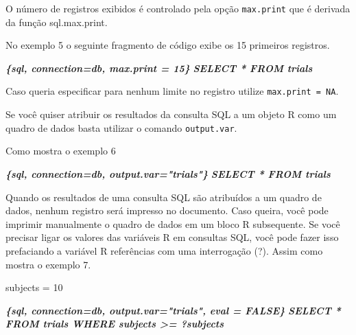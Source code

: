 \documentclass[
]{book}
\newenvironment{Shaded}{\begin{snugshade}}{\end{snugshade}}
\newcommand{\DecValTok}[1]{\textcolor[rgb]{0.00,0.00,0.81}{#1}}
\newcommand{\InformationTok}[1]{\textcolor[rgb]{0.56,0.35,0.01}{\textbf{\textit{#1}}}}
\newcommand{\NormalTok}[1]{#1}
\newcommand{\StringTok}[1]{\textcolor[rgb]{0.31,0.60,0.02}{#1}}
\begin{document}
O número de registros exibidos é controlado pela opção \texttt{max.print} que é derivada da função sql.max.print.

No exemplo 5 o seguinte fragmento de código exibe os 15 primeiros registros.

\begin{Shaded}
\begin{Highlighting}[]
 \InformationTok{\textasciigrave{}\textasciigrave{}\textasciigrave{}\{sql, connection=db, max.print = 15\}}
\InformationTok{SELECT * FROM trials}
\InformationTok{\textasciigrave{}\textasciigrave{}\textasciigrave{}}
\end{Highlighting}
\end{Shaded}

Caso queria especificar para nenhum limite no registro utilize \texttt{max.print\ =\ NA}.

Se você quiser atribuir os resultados da consulta SQL a um objeto R como um quadro de dados basta utilizar o comando \texttt{output.var}.

Como mostra o exemplo 6

\begin{Shaded}
\begin{Highlighting}[]
 \InformationTok{\textasciigrave{}\textasciigrave{}\textasciigrave{}\{sql, connection=db, output.var="trials"\}}
\InformationTok{SELECT * FROM trials}
\InformationTok{\textasciigrave{}\textasciigrave{}\textasciigrave{}}
\end{Highlighting}
\end{Shaded}

Quando os resultados de uma consulta SQL são atribuídos a um quadro de dados, nenhum registro será impresso no documento. Caso queira, você pode imprimir manualmente o quadro de dados em um bloco R subsequente. Se você precisar ligar os valores das variáveis R em consultas SQL, você pode fazer isso prefaciando a variável R referências com uma interrogação (?). Assim como mostra o exemplo 7.

\begin{Shaded}
\begin{Highlighting}[]
\NormalTok{subjects =}\StringTok{ }\DecValTok{10}
\end{Highlighting}
\end{Shaded}

\begin{Shaded}
\begin{Highlighting}[]
 \InformationTok{\textasciigrave{}\textasciigrave{}\textasciigrave{}\{sql, connection=db, output.var="trials", eval = FALSE\}}
\InformationTok{SELECT * FROM trials WHERE subjects \textgreater{}= ?subjects}
\InformationTok{\textasciigrave{}\textasciigrave{}\textasciigrave{}}
\end{Highlighting}
\end{Shaded}
\end{document}
